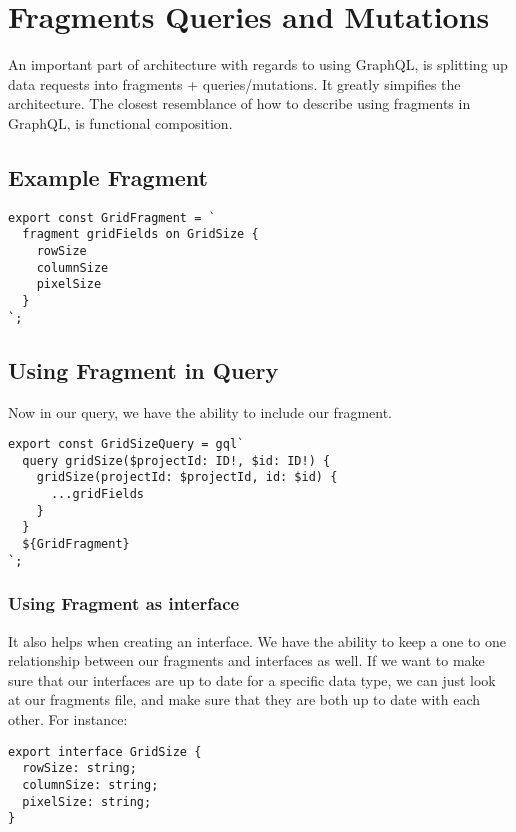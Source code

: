 \maketitle{}
\section{ Fragments Queries and Mutations }

An important part of architecture with regards to using GraphQL, is splitting
up data requests into fragments + queries/mutations. It greatly simpifies
the architecture. The closest resemblance of how to describe using fragments
in GraphQL, is functional composition.


\maketitle{}
\subsection{ Example Fragment }
\begin{verbatim}
export const GridFragment = `
  fragment gridFields on GridSize {
    rowSize
    columnSize
    pixelSize
  }
`;
\end{verbatim}

\subsection{ Using Fragment in Query }
Now in our query, we have the ability to include our fragment.
\begin{verbatim}
export const GridSizeQuery = gql`
  query gridSize($projectId: ID!, $id: ID!) {
    gridSize(projectId: $projectId, id: $id) {
      ...gridFields
    }
  }
  ${GridFragment}
`;
\end{verbatim}

\subsubsection{ Using Fragment as interface }
It also helps when creating an interface. We have the ability to keep a one to
one relationship between our fragments and interfaces as well. If we want to
make sure that our interfaces are up to date for a specific data type, we can
just look at our fragments file, and make sure that they are both up to date
with each other. For instance:
\begin{lstlisting}
export interface GridSize {
  rowSize: string;
  columnSize: string;
  pixelSize: string;
}
\end{lstlisting}

